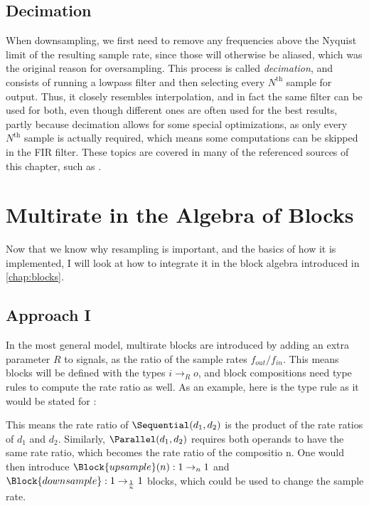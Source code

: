 \subsection{Decimation}

When downsampling, we first need to remove any frequencies above the Nyquist limit of the resulting sample
rate, since those will otherwise be aliased, which was the original reason for oversampling. This process is
called \emph{decimation}, and consists of running a lowpass filter and then selecting every
$N^\mathrm{th}$ sample for output. Thus, it closely resembles interpolation, and in fact the same
filter can be used for both, even though different ones are often used for the best results, partly because
decimation allows for some special optimizations, as only every $N^\mathrm{th}$ sample is actually
required, which means some computations can be skipped in the FIR filter. These topics are covered in many of
the referenced sources of this chapter, such as \autocite{kahles2019oversampling, SORIA2013, thomas2009}.

\section{Multirate in the Algebra of Blocks}

Now that we know why resampling is important, and the basics of how it is implemented, I will look at how to
integrate it in the block algebra introduced in \autoref{chap:blocks}.

\subsection{Approach I}
In the most general model, multirate blocks are introduced by adding an extra parameter
$R$ to signals, as the ratio of the sample rates $f_{out}/f_{in}$. This means blocks
will be defined with the types $i \rightarrow_R o$, and block compositions need type rules to compute the
rate ratio as well. As an example, here is the type rule as it would be stated for \Sequential:

\begin{prooftree}
\end{prooftree}

This means the rate ratio of $\Sequential(d_1, d_2)$ is the product of the rate ratios of
$d_1$ and $d_2$. Similarly, $\Parallel(d_1, d_2)$ requires both operands
to have the same rate ratio, which becomes the rate ratio of the compositio n. One would then introduce
$\Block{upsample}(n) : 1 \rightarrow_n 1$ and $\Block{downsample} : 1 \rightarrow_{\frac 1
    n} 1$ blocks, which could be used to change the sample rate.

